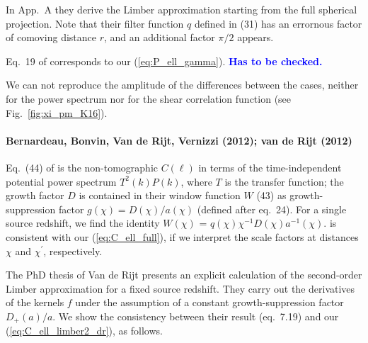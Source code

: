\documentclass[useAMS,usenatbib]{mn2e} %
\newcommand{\mk}[1]{{\bf\textcolor{blue}{#1}}}
\begin{document}
\begin{appendix}
In App.~A they derive the Limber approximation starting from the full spherical
projection. Note that their filter function $q$ defined in (31) has an
errornous factor of comoving distance $r$, and an additional factor $\pi/2$
appears.

Eq.~19 of \cite{2016arXiv161104954K} corresponds to our
(\ref{eq:P_ell_gamma}). \mk{Has to be checked.}

We can not reproduce the amplitude of the differences between the cases, neither for
the power spectrum nor for the shear correlation function (see Fig.~\ref{fig:xi_pm_K16}).


\paragraph{Bernardeau, Bonvin, Van de Rijt, Vernizzi (2012); van de Rijt (2012)}

Eq.~(44) of \cite{2012PhRvD..86b3001B} is the non-tomographic $C(\ell)$ in
terms of the time-independent potential power spectrum $T^2(k) P(k)$, where $T$
is the transfer function; the growth factor $D$ is contained in their window
function $W$ (43) as growth-suppression factor $g(\chi) = D(\chi)/a(\chi)$
(defined after eq.~{24}). For a single source redshift, we find the identity
$W(\chi)$ = $q(\chi)\chi^{-1} D(\chi) a^{-1}(\chi)$.
\cite{2012PhRvD..86b3001B} is consistent with our
(\ref{eq:C_ell_full}), if we interpret the
scale factors at distances $\chi$ and $\chi^\prime$, respectively.

The PhD thesis of Van de Rijt \cite{vande2012} presents an explicit calculation
of the second-order Limber approximation for a fixed source redshift. They
carry out the derivatives of the kernels $f$ under the assumption of a constant
growth-suppression factor $D_+(a)/a$. We show the consistency between their
result (eq.~7.19) and our (\ref{eq:C_ell_limber2_dr}), as follows.


\end{appendix}
\end{document}
